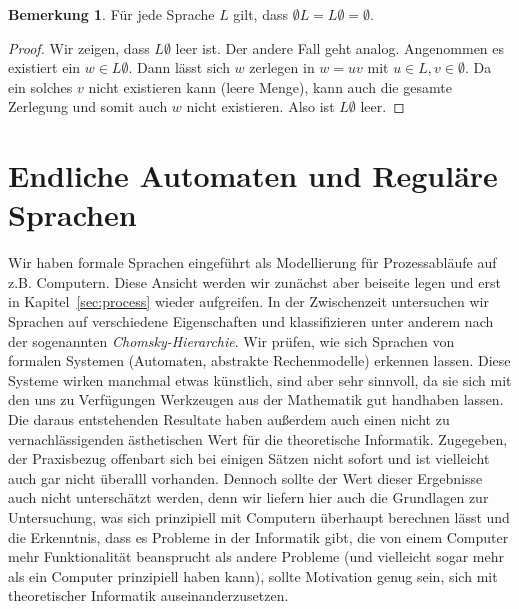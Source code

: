 \documentclass[11pt, a4paper]{article}
\theoremstyle{definition}
\newtheorem*{remark*}{Bemerkung}
\theoremstyle{plain}
\numberwithin{equation}{section}
\begin{document}
\begin{remark*}
	Für jede Sprache \( L \) gilt, dass \( \emptyset L = L \emptyset = \emptyset \).
	\begin{proof}
		Wir zeigen, dass \( L \emptyset \) leer ist. Der andere Fall geht analog. Angenommen es existiert ein \( w \in L \emptyset \). Dann lässt sich \( w \) zerlegen in \( w = uv \) mit \( u \in L, v \in \emptyset \). Da ein solches \( v \) nicht existieren kann (leere Menge), kann auch die gesamte Zerlegung und somit auch \( w \) nicht existieren. Also ist \( L \emptyset \) leer.
	\end{proof}
\end{remark*}



\newpage
\section{Endliche Automaten und Reguläre Sprachen}\label{sec:regular}
Wir haben formale Sprachen eingeführt als Modellierung für Prozessabläufe auf z.B. Computern. Diese Ansicht werden wir zunächst aber beiseite legen und erst in Kapitel~\ref{sec:process} wieder aufgreifen. In der Zwischenzeit untersuchen wir Sprachen auf verschiedene Eigenschaften und klassifizieren unter anderem nach der sogenannten \textit{Chomsky-Hierarchie}. Wir prüfen, wie sich Sprachen von formalen Systemen (Automaten, abstrakte Rechenmodelle) erkennen lassen. Diese Systeme wirken manchmal etwas künstlich, sind aber sehr sinnvoll, da sie sich mit den uns zu Verfügungen Werkzeugen aus der Mathematik gut handhaben lassen. Die daraus entstehenden Resultate haben außerdem auch einen nicht zu vernachlässigenden ästhetischen Wert für die theoretische Informatik. Zugegeben, der Praxisbezug offenbart sich bei einigen Sätzen nicht sofort und ist vielleicht auch gar nicht überalll vorhanden. Dennoch sollte der Wert dieser Ergebnisse auch nicht unterschätzt werden, denn wir liefern hier auch die Grundlagen zur Untersuchung, was sich prinzipiell mit Computern überhaupt berechnen lässt und die Erkenntnis, dass es Probleme in der Informatik gibt, die von einem Computer mehr Funktionalität beansprucht als andere Probleme (und vielleicht sogar mehr als ein Computer prinzipiell haben kann), sollte Motivation genug sein, sich mit theoretischer Informatik auseinanderzusetzen.
\end{document}
